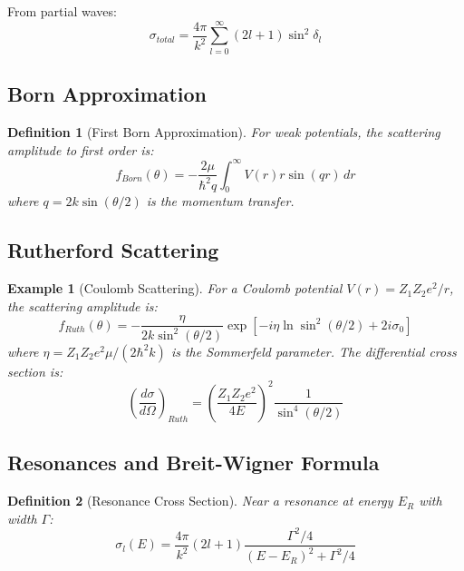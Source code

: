 \documentclass[a4paper, 11pt]{article}
\newtheorem{definition}{Definition}[section]
\newtheorem{example}{Example}[section]
\begin{document}
From partial waves:
\begin{equation}
\sigma_{total} = \frac{4\pi}{k^2} \sum_{l=0}^\infty (2l+1) \sin^2\delta_l
\end{equation}

\subsection{Born Approximation}

\begin{definition}[First Born Approximation]
For weak potentials, the scattering amplitude to first order is:
\begin{equation}
f_{Born}(\theta) = -\frac{2\mu}{\hbar^2 q} \int_0^\infty V(r) r \sin(qr) \, dr
\end{equation}
where $q = 2k\sin(\theta/2)$ is the momentum transfer.
\end{definition}

\subsection{Rutherford Scattering}

\begin{example}[Coulomb Scattering]
For a Coulomb potential $V(r) = Z_1 Z_2 e^2/r$, the scattering amplitude is:
\begin{equation}
f_{Ruth}(\theta) = -\frac{\eta}{2k \sin^2(\theta/2)} \exp\left[-i\eta \ln\sin^2(\theta/2) + 2i\sigma_0\right]
\end{equation}
where $\eta = Z_1 Z_2 e^2 \mu/(2\hbar^2 k)$ is the Sommerfeld parameter. The differential
cross section is:
\begin{equation}
\left(\frac{d\sigma}{d\Omega}\right)_{Ruth} = \left(\frac{Z_1 Z_2 e^2}{4E}\right)^2 \frac{1}{\sin^4(\theta/2)}
\end{equation}
\end{example}

\subsection{Resonances and Breit-Wigner Formula}

\begin{definition}[Resonance Cross Section]
Near a resonance at energy $E_R$ with width $\Gamma$:
\begin{equation}
\sigma_l(E) = \frac{4\pi}{k^2}(2l+1) \frac{\Gamma^2/4}{(E-E_R)^2 + \Gamma^2/4}
\end{equation}
\end{definition}
\end{document}

